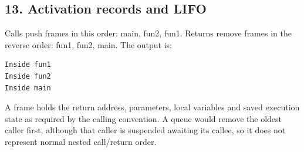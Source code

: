 \documentclass[11pt,a4paper]{article}
\begin{document}
\noindent\begin{minipage}{\linewidth}\subsection*{13. Activation records and LIFO}
Calls push frames in this order: main, fun2, fun1. Returns remove frames in the reverse order: fun1, fun2, main. The output is:
\begin{verbatim}
Inside fun1
Inside fun2
Inside main
\end{verbatim}
A frame holds the return address, parameters, local variables and saved execution state as required by the calling convention. A queue would remove the oldest caller first, although that caller is suspended awaiting its callee, so it does not represent normal nested call/return order.
\end{minipage}\par\medskip
\end{document}
